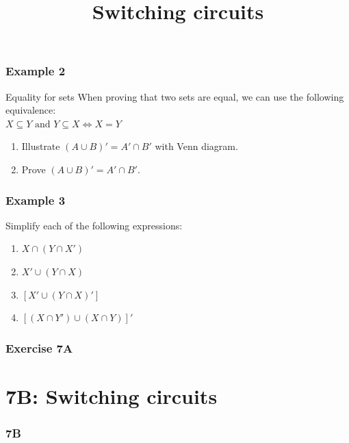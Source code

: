 \documentclass[
	11pt, %
]{beamer}
\begin{document}
\begin{frame}[t]
    \frametitle{Example 2}
    \begin{block}{Equality for sets}
        When proving that two sets are equal, we can use the following equivalence:\\
        $X\subseteq Y \text{ and } Y \subseteq X \iff X = Y$
    \end{block}
    \begin{enumerate}
        \item Illustrate $(A\cup B)' = A' \cap B'$ with Venn diagram.
        \item Prove $(A\cup B)' = A' \cap B'$.
    \end{enumerate}
\end{frame}
\begin{frame}
\end{frame}

\begin{frame}[t]
    \frametitle{Example 3}
    Simplify each of the following expressions:\\
    \begin{enumerate}
        \item $X \cap (Y \cap X')$
        \item $X' \cup (Y \cap X)$
        \item $[X' \cup (Y \cap X)']$
        \item $[(X \cap Y') \cup (X \cap Y)]'$
    \end{enumerate}
\end{frame}

\begin{frame}
\end{frame}

\begin{frame}
    \frametitle{Exercise 7A}
\end{frame}

\section{7B: Switching circuits}
\begin{frame}
    \frametitle{7B}
    \begin{center}
        \title{Switching circuits}
        \maketitle
    \end{center}
\end{frame}
\end{document}
